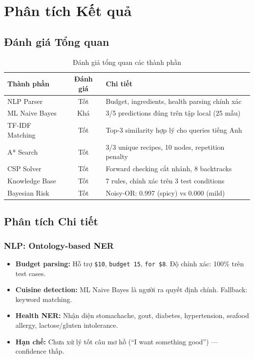 
\section{Phân tích Kết quả}
\label{sec:results}

\subsection{Đánh giá Tổng quan}

\begin{table}[H]
\centering
\begin{tabular}{|l|c|l|}
\hline
\textbf{Thành phần} & \textbf{Đánh giá} & \textbf{Chi tiết} \\
\hline
NLP Parser & Tốt & Budget, ingredients, health parsing chính xác \\
\hline
ML Naive Bayes & Khá & 3/5 predictions đúng trên tập local (25 mẫu) \\
\hline
TF-IDF Matching & Tốt & Top-3 similarity hợp lý cho queries tiếng Anh \\
\hline
A* Search & Tốt & 3/3 unique recipes, 10 nodes, repetition penalty \\
\hline
CSP Solver & Tốt & Forward checking cắt nhánh, 8 backtracks \\
\hline
Knowledge Base & Tốt & 7 rules, chính xác trên 3 test conditions \\
\hline
Bayesian Risk & Tốt & Noisy-OR: 0.997 (spicy) vs 0.000 (mild) \\
\hline
\end{tabular}
\caption{Đánh giá tổng quan các thành phần}
\end{table}

\subsection{Phân tích Chi tiết}

\subsubsection{NLP: Ontology-based NER}
\begin{itemize}
  \item \textbf{Budget parsing:} Hỗ trợ \texttt{\$10}, \texttt{budget 15}, \texttt{for \$8}. Độ chính xác: 100\% trên test cases.
  \item \textbf{Cuisine detection:} ML Naive Bayes là người ra quyết định chính. Fallback: keyword matching.
  \item \textbf{Health NER:} Nhận diện stomachache, gout, diabetes, hypertension, seafood allergy, lactose/gluten intolerance.
  \item \textbf{Hạn chế:} Chưa xử lý tốt câu mơ hồ (``I want something good'') --- confidence thấp.
\end{itemize}

